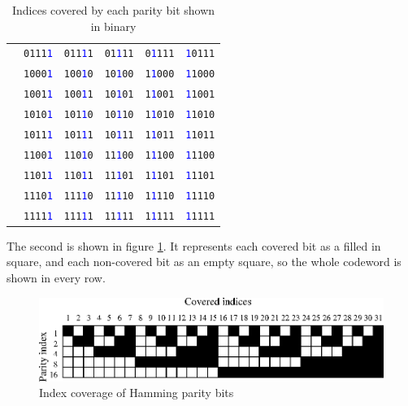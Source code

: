 \documentclass[a4paper,11pt]{article}
\begin{document}
\begin{table}[H]
\begin{center}
\begin{tabular}{l|rrrrr}
    & \texttt{0111\textcolor{blue}{1}} & \texttt{011\textcolor{blue}{1}1} & \texttt{01\textcolor{blue}{1}11} & \texttt{0\textcolor{blue}{1}111} & \texttt{\textcolor{blue}{1}0111} \\
    & \texttt{1000\textcolor{blue}{1}} & \texttt{100\textcolor{blue}{1}0} & \texttt{10\textcolor{blue}{1}00} & \texttt{1\textcolor{blue}{1}000} & \texttt{\textcolor{blue}{1}1000} \\
    & \texttt{1001\textcolor{blue}{1}} & \texttt{100\textcolor{blue}{1}1} & \texttt{10\textcolor{blue}{1}01} & \texttt{1\textcolor{blue}{1}001} & \texttt{\textcolor{blue}{1}1001} \\
    & \texttt{1010\textcolor{blue}{1}} & \texttt{101\textcolor{blue}{1}0} & \texttt{10\textcolor{blue}{1}10} & \texttt{1\textcolor{blue}{1}010} & \texttt{\textcolor{blue}{1}1010} \\
    & \texttt{1011\textcolor{blue}{1}} & \texttt{101\textcolor{blue}{1}1} & \texttt{10\textcolor{blue}{1}11} & \texttt{1\textcolor{blue}{1}011} & \texttt{\textcolor{blue}{1}1011} \\
    & \texttt{1100\textcolor{blue}{1}} & \texttt{110\textcolor{blue}{1}0} & \texttt{11\textcolor{blue}{1}00} & \texttt{1\textcolor{blue}{1}100} & \texttt{\textcolor{blue}{1}1100} \\
    & \texttt{1101\textcolor{blue}{1}} & \texttt{110\textcolor{blue}{1}1} & \texttt{11\textcolor{blue}{1}01} & \texttt{1\textcolor{blue}{1}101} & \texttt{\textcolor{blue}{1}1101} \\
    & \texttt{1110\textcolor{blue}{1}} & \texttt{111\textcolor{blue}{1}0} & \texttt{11\textcolor{blue}{1}10} & \texttt{1\textcolor{blue}{1}110} & \texttt{\textcolor{blue}{1}1110} \\
    & \texttt{1111\textcolor{blue}{1}} & \texttt{111\textcolor{blue}{1}1} & \texttt{11\textcolor{blue}{1}11} & \texttt{1\textcolor{blue}{1}111} & \texttt{\textcolor{blue}{1}1111} \\
    \bottomrule
    \end{tabular}
    \caption{Indices covered by each parity bit shown in binary}\label{tab:hamming-binary}
\end{center}
\end{table}

    The second is shown in figure \ref{fig:hamming}. It represents each covered
    bit as a filled in square, and each non-covered bit as an empty square, so
    the whole codeword is shown in every row.

\begin{figure}[H]
\begin{center}
\includegraphics{../psfiles/hamming_visualisation.eps}
\end{center}
\caption{Index coverage of Hamming parity bits}\label{fig:hamming}
\end{figure}
\end{document}
